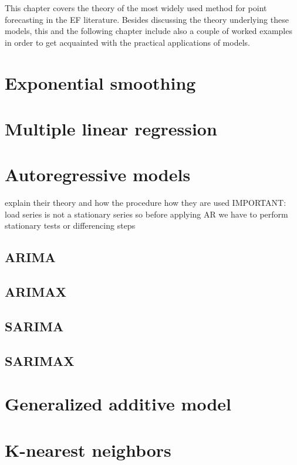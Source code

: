 This chapter covers the theory of the most widely used method for point forecasting in the EF literature. Besides discussing the theory underlying these models, this and the following chapter include also a couple of worked examples in order to get acquainted with the practical applications of models.
\section{Exponential smoothing}

\section{Multiple linear regression}

\section{Autoregressive models}
explain their theory
and how the procedure how they are used
IMPORTANT: load series is not a stationary series so before applying AR we have to perform stationary tests or differencing steps
\subsection{ARIMA}
\subsection{ARIMAX}
\subsection{SARIMA}
\subsection{SARIMAX}

\section{Generalized additive model}
\section{K-nearest neighbors}

